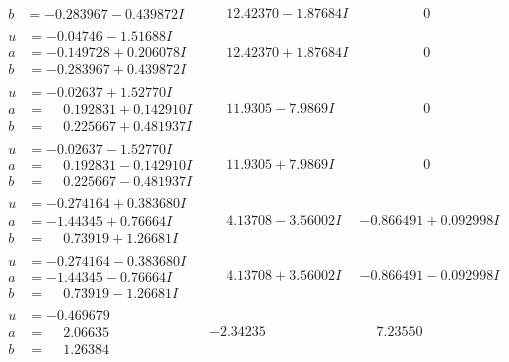 \documentclass[1p]{elsarticle_modified}
\theoremstyle{definition}
\begin{document}
$$\begin{array}{c|c|c}
\begin{aligned}
b &= -0.283967 - 0.439872 I\end{aligned}
 & \phantom{-}12.42370 - 1.87684 I & \phantom{-0.000000 } 0 \\ \hline\begin{aligned}
u &= -0.04746 - 1.51688 I \\
a &= -0.149728 + 0.206078 I \\
b &= -0.283967 + 0.439872 I\end{aligned}
 & \phantom{-}12.42370 + 1.87684 I & \phantom{-0.000000 } 0 \\ \hline\begin{aligned}
u &= -0.02637 + 1.52770 I \\
a &= \phantom{-}0.192831 + 0.142910 I \\
b &= \phantom{-}0.225667 + 0.481937 I\end{aligned}
 & \phantom{-}11.9305 - 7.9869 I & \phantom{-0.000000 } 0 \\ \hline\begin{aligned}
u &= -0.02637 - 1.52770 I \\
a &= \phantom{-}0.192831 - 0.142910 I \\
b &= \phantom{-}0.225667 - 0.481937 I\end{aligned}
 & \phantom{-}11.9305 + 7.9869 I & \phantom{-0.000000 } 0 \\ \hline\begin{aligned}
u &= -0.274164 + 0.383680 I \\
a &= -1.44345 + 0.76664 I \\
b &= \phantom{-}0.73919 + 1.26681 I\end{aligned}
 & \phantom{-}4.13708 - 3.56002 I & -0.866491 + 0.092998 I \\ \hline\begin{aligned}
u &= -0.274164 - 0.383680 I \\
a &= -1.44345 - 0.76664 I \\
b &= \phantom{-}0.73919 - 1.26681 I\end{aligned}
 & \phantom{-}4.13708 + 3.56002 I & -0.866491 - 0.092998 I \\ \hline\begin{aligned}
u &= -0.469679\phantom{ +0.000000I} \\
a &= \phantom{-}2.06635\phantom{ +0.000000I} \\
b &= \phantom{-}1.26384\phantom{ +0.000000I}\end{aligned}
 & -2.34235\phantom{ +0.000000I} & \phantom{-}7.23550\phantom{ +0.000000I}\\

\end{array}$$
\end{document}
